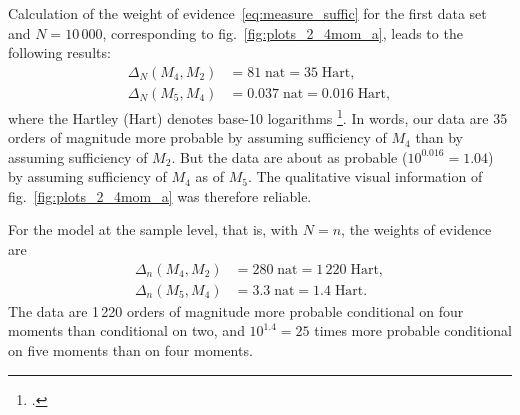 \documentclass[\ifafour a4paper,12pt,\else a5paper,10pt,\fi%
onecolumn,oneside,article,%
british%
]{memoir}
\theoremstyle{remark}
\theoremstyle{innote}
\newcommand*{\citep}{\footcites}
\renewcommand*{\|}{\nonscript\,\vert\nonscript\;\mathopen{}}
\newcommand*{\sect}{\S}%
\newcommand*{\fig}{fig.}%
\newcommand*{\ydi}{\varDelta}
\newcommand*{\nat}{\textrm{nat}}
\newcommand*{\hart}{\textrm{Hart}}
\begin{document}
Calculation of the weight of evidence~\eqref{eq:measure_suffic} for the
first data set and $N=10\,000$, corresponding to
\fig~\ref{fig:plots_2_4mom_a}, leads to the following results:
\begin{equation}
  \label{eq:diff_suff_N}
  \begin{split}
  \ydi_{N}(M_{4},M_{2}) &= 81\;\nat = 35\;\hart,
\\    \ydi_{N}(M_{5},M_{4}) &= 0.037\;\nat = 0.016\;\hart,
  \end{split}
\end{equation}
where the Hartley ($\hart$) denotes base-10 logarithms
\citep[\sect~C.4]{iso2009}[called \enquote{ban} and used by Turing and Good
in their code-breaking work at Bletchley Park:
see][]{good1985%
}[\sect~4.2]{jaynes1994_r2003}. In words, our data are 35 orders of
magnitude more probable by assuming sufficiency of $M_{4}$ than by assuming
sufficiency of $M_{2}$. But the data are about as probable
($10^{0.016} = 1.04$) by assuming sufficiency of $M_{4}$ as of $M_{5}$. The
qualitative visual information of \fig~\ref{fig:plots_2_4mom_a} was
therefore reliable.

For the model at the sample level, that is, with $N=n$, the weights of
evidence are
\begin{equation}
  \label{eq:diff_suff_n}
  \begin{split}
  \ydi_{n}(M_{4},M_{2}) &= 280\;\nat = 1\,220\;\hart,
\\    \ydi_{n}(M_{5},M_{4}) &= 3.3\;\nat = 1.4\;\hart.
\end{split}
\end{equation}
The data are 1\,220 orders of magnitude more probable conditional on four
moments than conditional on two, and $10^{1.4}=25$ times more probable
conditional on five moments than on four moments.
\end{document}
